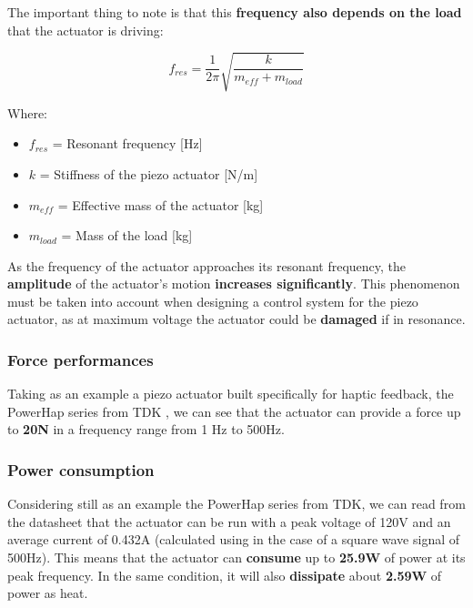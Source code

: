 \begin{samepage}
    The important thing to note is that this \textbf{frequency also depends on the load} that the actuator is driving:
    \nopagebreak

    \begin{equation*}
        f_{res} = \frac{1}{2\pi} \sqrt{\frac{k}{m_{eff}+m_{load}}}
    \end{equation*}
    \nopagebreak

    Where:
    \nopagebreak

    \begin{itemize}
        \item \( f_{res} \) = Resonant frequency [Hz]
        \item \( k \) = Stiffness of the piezo actuator [N/m]
        \item \( m_{eff} \) = Effective mass of the actuator [kg]
        \item \( m_{load} \) = Mass of the load [kg]
    \end{itemize}
\end{samepage}


As the frequency of the actuator approaches its resonant frequency, the \textbf{amplitude} of the actuator's motion \textbf{increases significantly}. This phenomenon must be taken into account when designing a control system for the piezo actuator, as at maximum voltage the actuator could be \textbf{damaged} if in resonance.

\subsubsection{Force performances}
Taking as an example a piezo actuator built specifically for haptic feedback, the PowerHap series from TDK \cite{Piezo_Haptic_Actuator}, we can see that the actuator can provide a force up to \textbf{20N} in a frequency range from 1 Hz to 500Hz.

\subsubsection{Power consumption}
Considering still as an example the PowerHap series from TDK, we can read from the datasheet that the actuator can be run with a peak voltage of 120V and an average current of 0.432A (calculated using \cite{Power_piezo_calculator} in the case of a square wave signal of 500Hz). This means that the actuator can \textbf{consume} up to \textbf{25.9W} of power at its peak frequency.
In the same condition, it will also \textbf{dissipate} about \textbf{2.59W} of power as heat.


